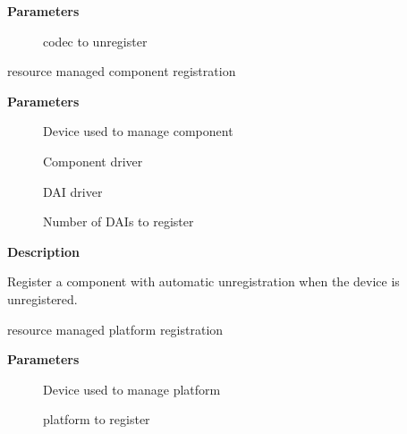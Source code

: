 \documentclass[a4paper,8pt,english]{sphinxmanual}
\begin{document}
\textbf{Parameters}
\begin{description}
\item[{}] \leavevmode
codec to unregister

\end{description}

\begin{fulllineitems}
\label{sound/kernel-api/alsa-driver-api:c.devm_snd_soc_register_component}
resource managed component registration

\end{fulllineitems}


\textbf{Parameters}
\begin{description}
\item[{}] \leavevmode
Device used to manage component

\item[{}] \leavevmode
Component driver

\item[{}] \leavevmode
DAI driver

\item[{}] \leavevmode
Number of DAIs to register

\end{description}

\textbf{Description}

Register a component with automatic unregistration when the device is
unregistered.

\begin{fulllineitems}
\label{sound/kernel-api/alsa-driver-api:c.devm_snd_soc_register_platform}
resource managed platform registration

\end{fulllineitems}


\textbf{Parameters}
\begin{description}
\item[{}] \leavevmode
Device used to manage platform

\item[{}] \leavevmode
platform to register

\end{description}
\end{document}
